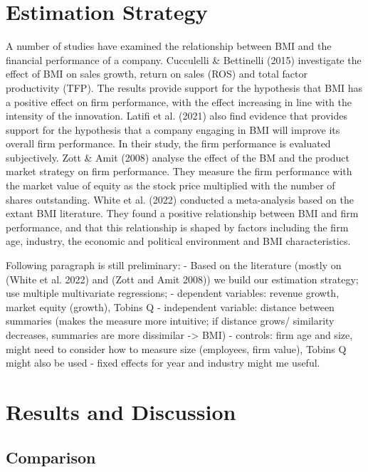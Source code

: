 \documentclass[
]{article}
\begin{document}
\section{Estimation Strategy}\label{estimation-strategy}

A number of studies have examined the relationship between BMI and the
financial performance of a company. Cucculelli \& Bettinelli (2015)
investigate the effect of BMI on sales growth, return on sales (ROS) and
total factor productivity (TFP). The results provide support for the
hypothesis that BMI has a positive effect on firm performance, with the
effect increasing in line with the intensity of the innovation. Latifi
et al. (2021) also find evidence that provides support for the
hypothesis that a company engaging in BMI will improve its overall firm
performance. In their study, the firm performance is evaluated
subjectively. Zott \& Amit (2008) analyse the effect of the BM and the
product market strategy on firm performance. They measure the firm
performance with the market value of equity as the stock price
multiplied with the number of shares outstanding. White et al. (2022)
conducted a meta-analysis based on the extant BMI literature. They found
a positive relationship between BMI and firm performance, and that this
relationship is shaped by factors including the firm age, industry, the
economic and political environment and BMI characteristics.

Following paragraph is still preliminary: - Based on the literature
(mostly on (White et al. 2022) and (Zott and Amit 2008)) we build our
estimation strategy; use multiple multivariate regressions; - dependent
variables: revenue growth, market equity (growth), Tobins Q -
independent variable: distance between summaries (makes the measure more
intuitive; if distance grows/ similarity decreases, summaries are more
dissimilar -\textgreater{} BMI) - controls: firm age and size, might
need to consider how to measure size (employees, firm value), Tobins Q
might also be used - fixed effects for year and industry might me
useful.

\section{Results and Discussion}\label{results-and-discussion}

\subsection{Comparison}\label{comparison}
\end{document}
